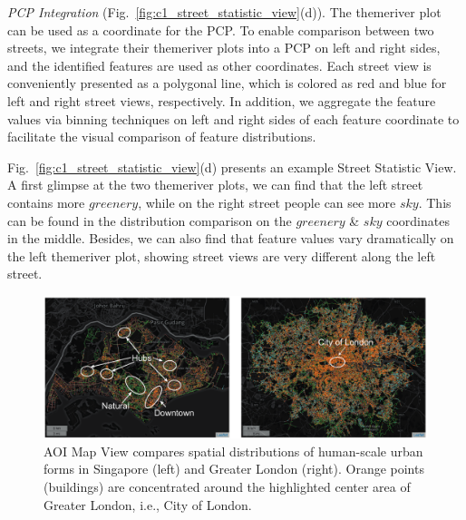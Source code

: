 \vspace*{1mm}
\noindent
\textit{PCP Integration} (Fig.~\ref{fig:c1_street_statistic_view}(d)).
The themeriver plot can be used as a coordinate for the PCP.
To enable comparison between two streets, we integrate their themeriver plots into a PCP on left and right sides, and the identified features are used as other coordinates.
Each street view is conveniently presented as a polygonal line, which is colored as red and blue for left and right street views, respectively.
In addition, we aggregate the feature values via binning techniques on left and right sides of each feature coordinate to facilitate the visual comparison of feature distributions.

\vspace*{1mm}
Fig.~\ref{fig:c1_street_statistic_view}(d) presents an example Street Statistic View.
A first glimpse at the two themeriver plots, we can find that the left street contains more $greenery$, while on the right street people can see more $sky$.
This can be found in the distribution comparison on the $greenery$ \& $sky$ coordinates in the middle.
Besides, we can also find that feature values vary dramatically on the left themeriver plot, showing street views are very different along the left street.


\begin{figure}[t]
	\centering
	\includegraphics[width=0.95\columnwidth]{figure/streetvizor/fig8_study_1/study_1_spatial}
	\vspace{-4mm}
	\caption{
	AOI Map View compares spatial distributions of human-scale urban forms in Singapore (left) and Greater London (right).
	Orange points (buildings) are concentrated around the highlighted center area of Greater London, i.e., City of London.}
	\label{fig:c1_study_1_spatial}
\end{figure}

